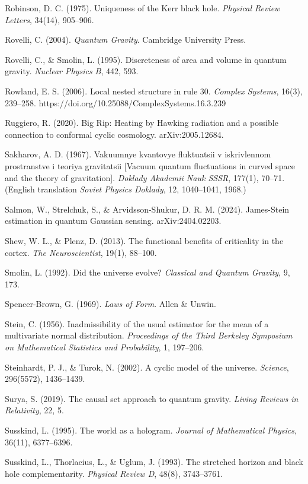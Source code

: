 \documentclass[
]{article}
\begin{document}
Robinson, D. C. (1975). Uniqueness of the Kerr black hole.
\emph{Physical Review Letters}, 34(14), 905--906.

Rovelli, C. (2004). \emph{Quantum Gravity}. Cambridge University Press.

Rovelli, C., \& Smolin, L. (1995). Discreteness of area and volume in
quantum gravity. \emph{Nuclear Physics B}, 442, 593.

Rowland, E. S. (2006). Local nested structure in rule 30. \emph{Complex
Systems}, 16(3), 239--258.
https://doi.org/10.25088/ComplexSystems.16.3.239

Ruggiero, R. (2020). Big Rip: Heating by Hawking radiation and a
possible connection to conformal cyclic cosmology. arXiv:2005.12684.

Sakharov, A. D. (1967). Vakuumnye kvantovye fluktuatsii v iskrivlennom
prostranstve i teoriya gravitatsii {[}Vacuum quantum fluctuations in
curved space and the theory of gravitation{]}. \emph{Doklady Akademii
Nauk SSSR}, 177(1), 70--71. (English translation \emph{Soviet Physics
Doklady}, 12, 1040--1041, 1968.)

Salmon, W., Strelchuk, S., \& Arvidsson-Shukur, D. R. M. (2024).
James-Stein estimation in quantum Gaussian sensing. arXiv:2404.02203.

Shew, W. L., \& Plenz, D. (2013). The functional benefits of criticality
in the cortex. \emph{The Neuroscientist}, 19(1), 88--100.

Smolin, L. (1992). Did the universe evolve? \emph{Classical and Quantum
Gravity}, 9, 173.

Spencer-Brown, G. (1969). \emph{Laws of Form}. Allen \& Unwin.

Stein, C. (1956). Inadmissibility of the usual estimator for the mean of
a multivariate normal distribution. \emph{Proceedings of the Third
Berkeley Symposium on Mathematical Statistics and Probability}, 1,
197--206.

Steinhardt, P. J., \& Turok, N. (2002). A cyclic model of the universe.
\emph{Science}, 296(5572), 1436--1439.

Surya, S. (2019). The causal set approach to quantum gravity.
\emph{Living Reviews in Relativity}, 22, 5.

Susskind, L. (1995). The world as a hologram. \emph{Journal of
Mathematical Physics}, 36(11), 6377--6396.

Susskind, L., Thorlacius, L., \& Uglum, J. (1993). The stretched horizon
and black hole complementarity. \emph{Physical Review D}, 48(8),
3743--3761.
\end{document}
